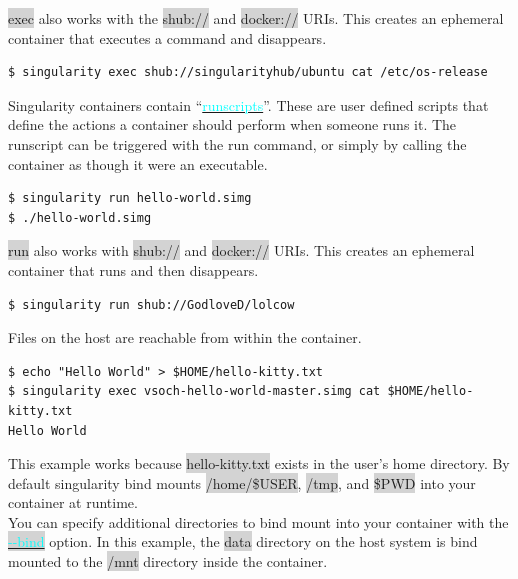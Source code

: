 \documentclass[a4paper]{article}
\newcounter{subsubsubsection}[subsubsection]
\begin{document}
 \colorbox{lightgray}{exec} also works with the  \colorbox{lightgray}{shub://} and  \colorbox{lightgray}{docker://} URIs. This creates an ephemeral container that executes a command and disappears.\\


\begin{lstlisting}[frame=single]
$ singularity exec shub://singularityhub/ubuntu cat /etc/os-release
\end{lstlisting}


Singularity containers contain “\hyperref[sec:runscript]{{\textcolor{cyan}{runscripts}}}”. These are user defined scripts that define the actions a container should perform when someone runs it. The runscript can be triggered with the run command, or simply by calling the container as though it were an executable.
\begin{lstlisting}[frame=single]
$ singularity run hello-world.simg
$ ./hello-world.simg
\end{lstlisting}

\colorbox{lightgray}{run} also works with \colorbox{lightgray}{shub://} and \colorbox{lightgray}{docker://} URIs. This creates an ephemeral container that runs and then disappears.

\begin{lstlisting}[frame=single]
$ singularity run shub://GodloveD/lolcow
\end{lstlisting}


Files on the host are reachable from within the container.\\[0.1in]

\begin{lstlisting}[frame=single]
$ echo "Hello World" > $HOME/hello-kitty.txt
$ singularity exec vsoch-hello-world-master.simg cat $HOME/hello-kitty.txt
Hello World
\end{lstlisting}

This example works because \colorbox{lightgray}{hello-kitty.txt} exists in the user’s home directory. By default singularity bind mounts \colorbox{lightgray}{/home/\$USER}, \colorbox{lightgray}{/tmp}, and \colorbox{lightgray}{\$PWD} into your container at runtime.\\

You can specify additional directories to bind mount into your container with the \colorbox{lightgray}{\hyperref[sec:bindpaths]{{\textcolor{cyan}{-{}-bind}}}} option. In this example, the \colorbox{lightgray}{data} directory on the host system is bind mounted to the  \colorbox{lightgray}{/mnt} directory inside the container.\\
\end{document}
